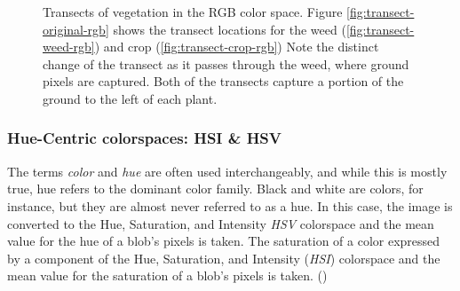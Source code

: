 \documentclass[letterpaper]{article}
\begin{document}
{%

\begin{figure}[h]
	\centering
	\hfill
	\hfill
	\caption[RGB Transects]{Transects of vegetation in the RGB color space. Figure \ref{fig:transect-original-rgb} shows the transect locations for the weed (\ref{fig:transect-weed-rgb}) and crop (\ref{fig:transect-crop-rgb}) Note the distinct change of the transect as it passes through the weed, where ground pixels are captured. Both of the transects capture a portion of the ground to the left of each plant.}
	\label{fig:transects-rgb}
\end{figure}
	
\subsubsection{Hue-Centric colorspaces: HSI \& HSV}
The terms {\it color} and {\it hue} are often used interchangeably, and while this is mostly true, hue refers to the dominant color family. Black and white are colors, for instance, but they are almost never referred to as a hue. In this case, the image is converted to the Hue, Saturation, and Intensity {\it HSV} colorspace and the mean value for the hue of a blob's pixels is taken. The saturation of a color expressed by a component of the Hue, Saturation, and Intensity ({\it HSI}) colorspace and the mean value for the saturation of a blob's pixels is taken. (\cite{Forsyth2012-hy})

}
\end{document}
